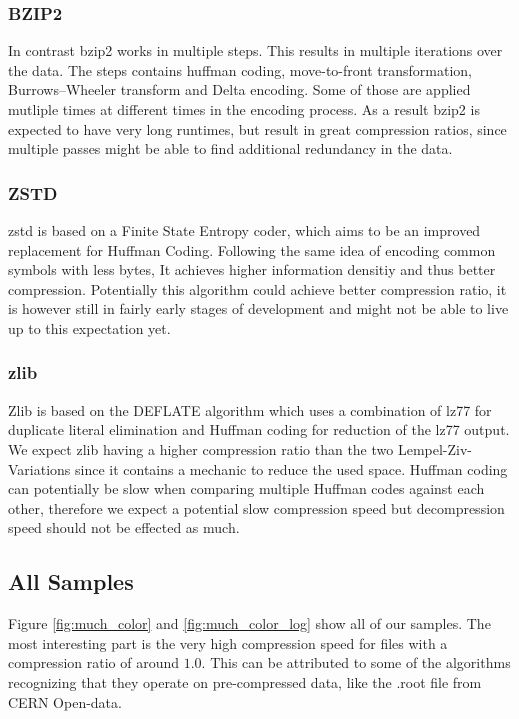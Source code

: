 \documentclass[
	12pt,
	a4paper,
	BCOR10mm,
	DIV14,
	listof=totoc,
	bibliography=totoc,
	headsepline
]{scrreprt}
\begin{document}
\subsubsection{BZIP2}
In contrast bzip2 works in multiple steps. This results in multiple iterations over the data. 
The steps contains huffman coding, move-to-front transformation, Burrows–Wheeler transform and Delta encoding. 
Some of those are applied mutliple times at different times in the encoding process. 
As a result bzip2 is expected to have very long runtimes, but result in great compression ratios, since multiple passes might be able to find additional redundancy in the data.
\subsubsection{ZSTD}
zstd is based on a Finite State Entropy coder, which aims to be an improved replacement for Huffman Coding.
Following the same idea of encoding common symbols with less bytes, It achieves higher information densitiy and thus better compression.
Potentially this algorithm could achieve better compression ratio, it is however still in fairly early stages of development and might not be able to live up to this expectation yet.
\subsubsection{zlib}
Zlib is based on the DEFLATE algorithm which uses a combination of lz77 for duplicate literal elimination and Huffman coding for reduction of the lz77 output.
We expect zlib having a higher compression ratio than the two Lempel-Ziv-Variations since it contains a mechanic to reduce the used space.
Huffman coding can potentially be slow when comparing multiple Huffman codes against each other, therefore we expect a potential slow compression speed but decompression speed should not be effected as much.



\subsection{All Samples}



Figure \ref{fig:much_color} and \ref{fig:much_color_log} show all of our samples. The most interesting part is the very high compression speed for files with a compression ratio of around $1.0$. This can be attributed to some of the algorithms recognizing that they operate on pre-compressed data, like the .root file from CERN Open-data.
\end{document}
